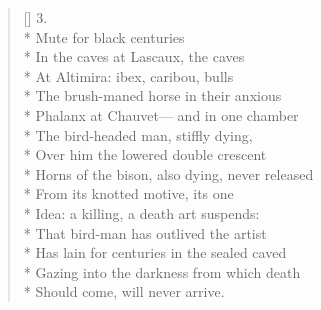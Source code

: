 \begin{verse}[\versewidth]
3.\\*
Mute for black centuries\\*
In the caves at Lascaux, the caves\\*
At Altimira: ibex, caribou, bulls\\*
The brush-maned horse in their anxious\\*
Phalanx at Chauvet--- and in one chamber\\*
The bird-headed man, stiffly dying,\\*
Over him the lowered double crescent\\*
Horns of the bison, also dying, never released\\*
From its knotted motive, its one\\*
Idea: a killing, a death art suspends:\\*
That bird-man has outlived the artist\\*
Has lain for centuries in the sealed caved\\*
Gazing into the darkness from which death\\*
Should come, will never arrive. 
\end{verse}
